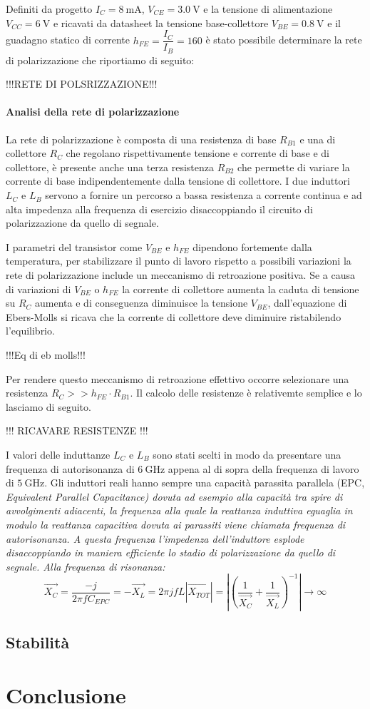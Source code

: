 \documentclass[12pt]{article}
\begin{document}
Definiti da progetto $I_{C}=\SI{8}{\milli\ampere}$, $V_{CE}=\SI{3.0}{\volt}$ e la tensione di alimentazione $V_{CC}=\SI{6}{\volt}$ e ricavati da datasheet la tensione base-collettore $V_{BE} = \SI{0.8}{\volt}$ e il guadagno statico di corrente $h_{FE} = \dfrac{I_C}{I_B}=160$ è stato possibile determinare la rete di polarizzazione che riportiamo di seguito:

!!!RETE DI POLSRIZZAZIONE!!!

\paragraph{Analisi della rete di polarizzazione}
La rete di polarizzazione è composta di una resistenza di base $R_{B1}$ e una di collettore $R_C$ che regolano rispettivamente tensione e corrente di base e di collettore, è presente anche una terza resistenza $R_{B2}$ che permette di variare la corrente di base indipendentemente dalla tensione di collettore. I due induttori $L_C$ e $L_B$ servono a fornire un percorso a bassa resistenza a corrente continua e ad alta impedenza alla frequenza di esercizio disaccoppiando il circuito di polarizzazione da quello di segnale.

I parametri del transistor come $V_{BE}$ e $h_{FE}$ dipendono fortemente dalla temperatura, per stabilizzare il punto di lavoro rispetto a possibili variazioni la rete di polarizzazione include un meccanismo di retroazione positiva. Se a causa di variazioni di $V_{BE}$ o $h_{FE}$ la corrente di collettore aumenta la caduta di tensione su $R_{C}$ aumenta e di conseguenza diminuisce la tensione $V_{BE}$, dall'equazione di Ebers-Molls si ricava che la corrente di collettore deve diminuire ristabilendo l'equilibrio.

!!!Eq di eb molls!!!

Per rendere questo meccanismo di retroazione effettivo occorre selezionare una resistenza $R_{C}>>h_{FE} \cdot R_{B1}$. Il calcolo delle resistenze è relativemte semplice e lo lasciamo di seguito.

!!! RICAVARE RESISTENZE !!!

I valori delle induttanze $L_C$ e $L_B$ sono stati scelti in modo da presentare una frequenza di autorisonanza di $\SI{6}{\giga\hertz}$ appena al di sopra della frequenza di lavoro di $\SI{5}{\giga\hertz}$. Gli induttori reali hanno sempre una capacità parassita parallela (EPC, \it{Equivalent Parallel Capacitance}) dovuta ad esempio alla capacità tra spire di avvolgimenti adiacenti, la frequenza alla quale la reattanza induttiva eguaglia in modulo la reattanza capacitiva dovuta ai parassiti viene chiamata frequenza di autorisonanza. A questa frequenza l'impedenza dell'induttore esplode disaccoppiando in maniera efficiente lo stadio di polarizzazione da quello di segnale.
Alla frequenza di risonanza:
\begin{equation}
    \vec{X_C}=\dfrac{-j}{2\pi f C_{EPC}}=-\vec{X_L}=2 \pi j f L
    \left|\vec{X_{TOT}}\right|=\left|\left(\dfrac{1}{\vec{X_C}}+\dfrac{1}{\vec{X_L}}\right)^{-1}\right|\to\infty
\end{equation} 

\subsection{Stabilità}



\section{Conclusione}
\end{document}
